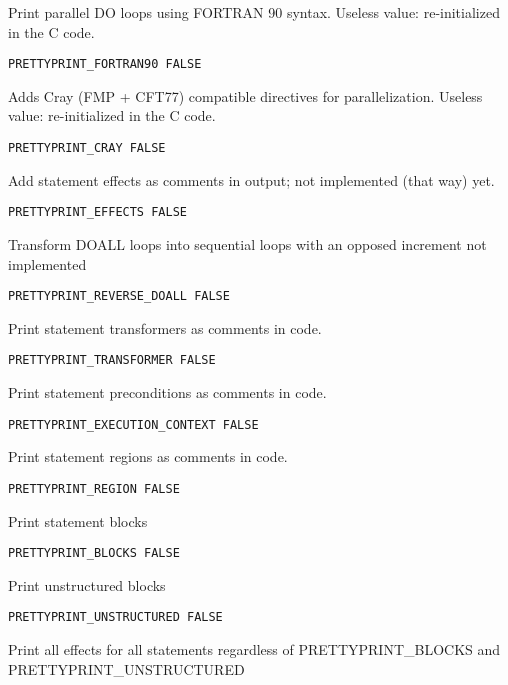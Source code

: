 Print parallel DO loops using FORTRAN 90 syntax. Useless value:
re-initialized in the C code.

\begin{verbatim}
PRETTYPRINT_FORTRAN90 FALSE
\end{verbatim}

Adds Cray (FMP + CFT77) compatible directives for parallelization.
Useless value: re-initialized in the C code.

\begin{verbatim}
PRETTYPRINT_CRAY FALSE
\end{verbatim}

Add statement effects as comments in output; not implemented (that way) yet.

\begin{verbatim}
PRETTYPRINT_EFFECTS FALSE
\end{verbatim}

Transform DOALL loops into sequential loops with an opposed increment
not implemented

\begin{verbatim}
PRETTYPRINT_REVERSE_DOALL FALSE
\end{verbatim}

Print statement transformers as comments in code.

\begin{verbatim}
PRETTYPRINT_TRANSFORMER FALSE
\end{verbatim}

Print statement preconditions as comments in code.

\begin{verbatim}
PRETTYPRINT_EXECUTION_CONTEXT FALSE
\end{verbatim}

Print statement regions as comments in code.

\begin{verbatim}
PRETTYPRINT_REGION FALSE
\end{verbatim}

Print statement blocks

\begin{verbatim}
PRETTYPRINT_BLOCKS FALSE
\end{verbatim}

Print unstructured blocks

\begin{verbatim}
PRETTYPRINT_UNSTRUCTURED FALSE
\end{verbatim}

Print all effects for all statements regardless of PRETTYPRINT\_BLOCKS
and PRETTYPRINT\_UNSTRUCTURED

